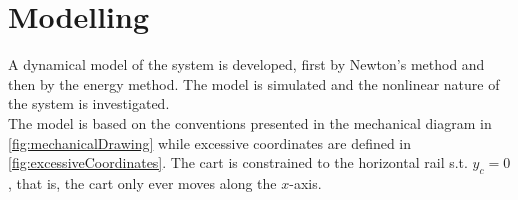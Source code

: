 \chapter{Modelling}
A dynamical model of the system is developed, first by Newton's method and then by the energy method. The model is simulated and the nonlinear nature of the system is investigated.\\
The model is based on the conventions presented in the mechanical diagram in \autoref{fig:mechanicalDrawing} while excessive coordinates are defined in \autoref{fig:excessiveCoordinates}. The cart is constrained to the horizontal rail s.t. $y_c = 0$, that is, the cart only ever moves along the $x$-axis.



